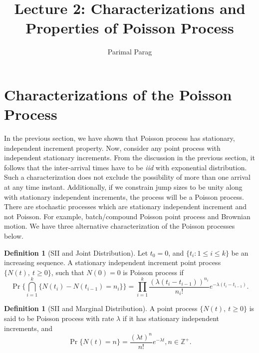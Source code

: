 \documentclass[a4paper,10pt]{article}
\date{}
\title{Lecture 2: Characterizations and Properties of Poisson Process}
\author{Parimal Parag}
\theoremstyle{plain}
\theoremstyle{definition}
\newtheorem{defn}[thm]{Definition}
\begin{document}
\maketitle

\section{Characterizations of the Poisson Process}

In the previous section, we have shown that Poisson process has stationary, independent increment property. Now, consider any point process with independent stationary increments. From the discussion in the previous section, it follows that the inter-arrival times have to be \emph{iid} with exponential distribution. Such a characterization does not exclude the possibility of more than one arrival at any time instant. Additionally, if we constrain jump sizes to be unity along with stationary independent increments, the process will be a Poisson process. There are stochastic processes which are stationary independent increment and not Poisson. For example, batch/compound Poisson point process and Brownian motion. We have three alternative characterization of the Poisson processes below. 

\begin{defn}[SII and Joint Distribution]\label{defn:SIIJoint} Let $t_0 = 0$, and $\{t_i: 1 \leq i \leq k\}$ be an increasing sequence. A stationary independent increment point process $\{N(t),~t\geqslant 0\}$, such that $N(0) = 0$ is Poisson process if 
\begin{equation*}
  \Pr\{\bigcap_{i=1}^k \{N(t_i)-N(t_{i-1})= n_{i}\}\} = \prod_{i=1}^{k}\frac{(\lambda(t_{i}-t_{i-1}))^{n_{i}}}{n_{i}!} e^{-\lambda (t_{i}-t_{i-1})}.
\end{equation*}
\end{defn}

\begin{defn}[SII and Marginal Distribution]\label{defn:SIIMarginal} A point process $\{N(t),~t\geqslant 0\}$ is said to be Poisson process with rate $\lambda$ if it has stationary independent increments, and 
\begin{equation*}
\Pr\{N(t)=n\}= \frac{(\lambda t)^{n}}{n!} e^{-\lambda t}, n\in \mathbb{Z}^+.
\end{equation*}
\end{defn}
\end{document}
